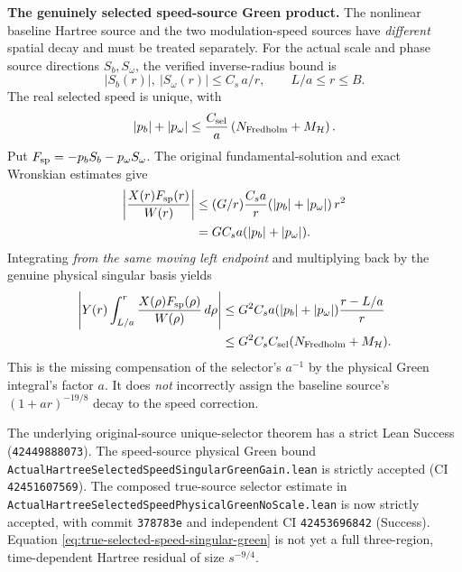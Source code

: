 \documentclass[11pt]{amsart}
\newcommand{\HH}{\mathcal H}
\begin{document}
\medskip
\noindent\textbf{The genuinely selected speed-source Green product.}
The nonlinear baseline Hartree source and the two modulation-speed
sources have \emph{different} spatial decay and must be treated
separately.  For the actual scale and phase source directions
$S_b,S_\omega$, the verified inverse-radius bound is
\[
 |S_b(r)|,\ |S_\omega(r)|\le C_s\,a/r,\qquad L/a\le r\le B.
\]
The real selected speed is unique, with
\[
 |p_b|+|p_\omega|
  \le \frac{C_{\rm sel}}{a}
     \left(N_{\mathrm{Fredholm}}+M_{\HH}\right).
\]
Put $F_{\rm sp}=-p_bS_b-p_\omega S_\omega$. The original
fundamental-solution and exact Wronskian estimates give
\begin{align*}
 \left|\frac{X(r)F_{\rm sp}(r)}{W(r)}\right|
 &\le (G/r)\frac{C_s a}{r}
       (|p_b|+|p_\omega|)\,r^2\\
 &=G C_s a(|p_b|+|p_\omega|).
\end{align*}
Integrating \emph{from the same moving left endpoint} and multiplying
back by the genuine physical singular basis yields
\begin{align}
 \left|Y(r)\int_{L/a}^{r}
       \frac{X(\rho)F_{\rm sp}(\rho)}{W(\rho)}\,d\rho\right|
 &\le G^2 C_s a(|p_b|+|p_\omega|)
       \frac{r-L/a}{r}\notag\\
 &\le G^2 C_s C_{\rm sel}
       (N_{\mathrm{Fredholm}}+M_{\HH}).
 \label{eq:true-selected-speed-singular-green}
\end{align}
This is the missing compensation of the selector's $a^{-1}$
by the physical Green integral's factor $a$. It does \emph{not}
incorrectly assign the baseline source's $(1+ar)^{-19/8}$
decay to the speed correction.

The underlying original-source unique-selector theorem has a strict
Lean Success (\texttt{42449888073}). The speed-source physical Green bound
\texttt{ActualHartreeSelectedSpeedSingularGreenGain.lean}
is strictly accepted (CI \texttt{42451607569}).
The composed true-source selector estimate in
\texttt{ActualHartreeSelectedSpeedPhysicalGreenNoScale.lean}
is now strictly accepted, with commit \texttt{378783e}
and independent CI \texttt{42453696842} (Success).
Equation \eqref{eq:true-selected-speed-singular-green}
is not yet a full three-region, time-dependent Hartree residual
of size $s^{-9/4}$.
\end{document}
